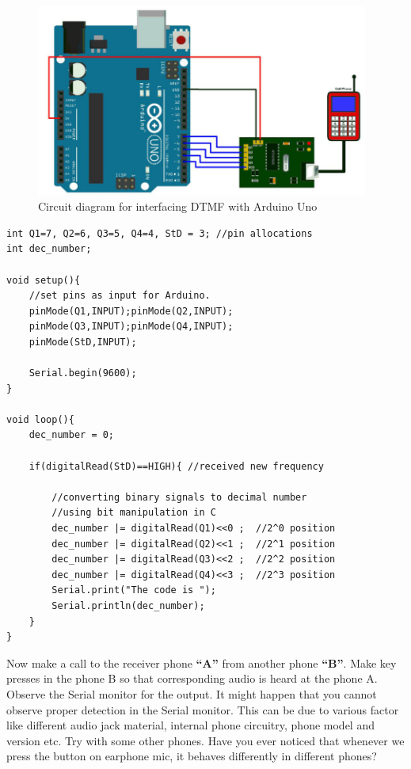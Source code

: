 \begin{figure}
    \centering
    \includegraphics[width=4.3in]{Images/DTMF/DTMF_ckt.png}
    \caption[DTMF with Arduino]{Circuit diagram for interfacing \ac{DTMF} with Arduino Uno }
    \label{fig:dtmf_ckt}
\end{figure}

\begin{lstlisting}[style=CStyle]
int Q1=7, Q2=6, Q3=5, Q4=4, StD = 3; //pin allocations
int dec_number;

void setup(){
    //set pins as input for Arduino.
    pinMode(Q1,INPUT);pinMode(Q2,INPUT);
    pinMode(Q3,INPUT);pinMode(Q4,INPUT);
    pinMode(StD,INPUT);
    
    Serial.begin(9600);
}

void loop(){
    dec_number = 0;
    
    if(digitalRead(StD)==HIGH){ //received new frequency
    
        //converting binary signals to decimal number
        //using bit manipulation in C
        dec_number |= digitalRead(Q1)<<0 ;  //2^0 position
        dec_number |= digitalRead(Q2)<<1 ;	//2^1 position
        dec_number |= digitalRead(Q3)<<2 ;	//2^2 position
        dec_number |= digitalRead(Q4)<<3 ;	//2^3 position
        Serial.print("The code is "); 
        Serial.println(dec_number);
    }
}
\end{lstlisting}

\par Now make a call to the receiver phone \textbf{“A”} from another phone \textbf{“B”}. Make key presses in the phone B so that corresponding audio is heard at the phone A. Observe the Serial monitor for the output. It might happen that you cannot observe proper detection in the Serial monitor. This can be due to various factor like different audio jack material, internal phone circuitry, phone model and version etc. Try with some other phones. Have you ever noticed that whenever we press the button on earphone mic, it behaves differently in different phones?

